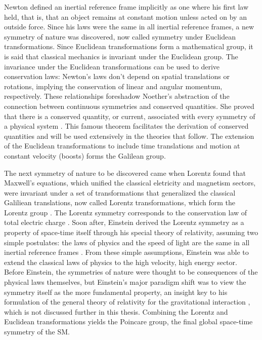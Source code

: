 \indent Newton defined an inertial reference frame implicitly as one where his first law held, that is, that an object remains at constant motion unless acted on by an outside force. Since his laws were the same in all inertial reference frames, a new symmetry of nature was discovered, now called symmetry under Euclidean transformations. Since Euclidean transformations form a mathematical group, it is said that classical mechanics is invariant under the Euclidean group. The invariance under the Euclidean transformations can be used to derive conservation laws: Newton's laws don't depend on spatial translations or rotations, implying the conservation of linear and angular momentum, respectively. These relationships foreshadow Noether's abstraction of the connection between continuous symmetries and conserved quantities. She proved that there is a conserved quantity, or current, associated with every symmetry of a physical system \cite{Noether:1918zz}. This famous theorem facilitates the derivation of conserved quantities and will be used extensively in the theories that follow. The extension of the Euclidean transformations to include time translations and motion at constant velocity (boosts) forms the Galilean group.

\indent The next symmetry of nature to be discovered came when Lorentz found that Maxwell's equations, which unified the classical eletricity and magnetism sectors, were invariant under a set of transformations that generalized the classical Galiliean translations, now called Lorentz transformations, which form the Lorentz group \cite{Lorentz}. The Lorentz symmetry corresponds to the conservation law of total electric charge \cite{Noether:1918zz2}. Soon after, Einstein derived the Lorentz symmetry as a property of space-time itself through his special theory of relativity, assuming two simple postulates: the laws of physics and the speed of light are the same in all inertial reference frames \cite{Einstein:1905ve}. From these simple assumptions, Einstein was able to extend the classical laws of physics to the high velocity, high energy sector. Before Einstein, the symmetries of nature were thought to be consequences of the physical laws themselves, but Einstein's major paradigm shift was to view the symmetry itself as the more fundamental property, an insight key to his formulation of the general theory of relativity for the gravitational interaction \cite{Einstein:1914bt}, which is not discussed further in this thesis. Combining the Lorentz and Euclidean transformations yields the Poincare group, the final global space-time symmetry of the SM.

